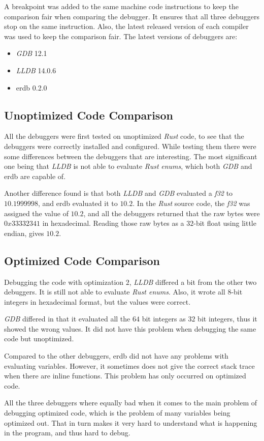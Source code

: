 A breakpoint was added to the same machine code instructions to keep the comparison fair when comparing the debugger.
It ensures that all three debuggers stop on the same instruction.
Also, the latest released version of each compiler was used to keep the comparison fair.
The latest versions of debuggers are:


\begin{itemize}
    \item \emph{GDB} 12.1
    \item \emph{LLDB} 14.0.6
    \item \gls{erdb} 0.2.0 %
\end{itemize}




\subsection{Unoptimized Code Comparison}
All the debuggers were first tested on unoptimized \emph{Rust} code, to see that the debuggers were correctly installed and configured.
While testing them there were some differences between the debuggers that are interesting.
The most significant one being that \emph{LLDB} is not able to evaluate \emph{Rust} \emph{enums}, which both \emph{GDB} and \gls{erdb} are capable of.


Another difference found is that both \emph{LLDB} and \emph{GDB} evaluated a \emph{f32} to $10.1999998$, and \gls{erdb} evaluated it to $10.2$.
In the \emph{Rust} source code, the \emph{f32} was assigned the value of $10.2$, and all the debuggers returned that the raw bytes were $0x33332341$ in hexadecimal.
Reading those raw bytes as a $32$-bit float using little endian, gives $10.2$.



\subsection{Optimized Code Comparison} %
Debugging the code with optimization $2$, \emph{LLDB} differed a bit from the other two debuggers.
It is still not able to evaluate \emph{Rust enums}.
Also, it wrote all $8$-bit integers in hexadecimal format, but the values were correct.


\emph{GDB} differed in that it evaluated all the $64$ bit integers as $32$ bit integers, thus it showed the wrong values.
It did not have this problem when debugging the same code but unoptimized.


Compared to the other debuggers, \gls{erdb} did not have any problems with evaluating variables.
However, it sometimes does not give the correct stack trace when there are inline functions.
This problem has only occurred on optimized code.


All the three debuggers where equally bad when it comes to the main problem of debugging optimized code, which is the problem of many variables being optimized out.
That in turn makes it very hard to understand what is happening in the program, and thus hard to debug.

